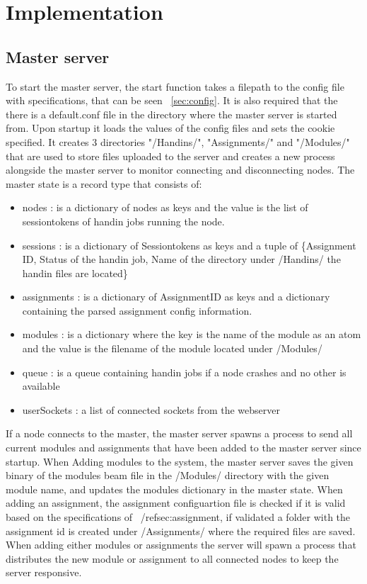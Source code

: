 \section{Implementation}
\subsection{Master server}
To start the master server, the start function takes a filepath to the config file with specifications, that can be seen ~\ref{sec:config}. It is also required that the there is a default.conf file in the directory where the master server is started from. Upon startup it loads the values of the config files and sets the cookie specified. It creates 3 directories "/Handins/", "Assignments/" and "/Modules/" that are used to store files uploaded to the server and creates a new process alongside the master server to monitor connecting and disconnecting nodes. The master state is a record type that consists of:
\begin{itemize}
\item nodes : is a dictionary of nodes as keys and the value is the list of sessiontokens of handin jobs running the node.
\item sessions : is a dictionary of Sessiontokens as keys and a tuple of \{Assignment ID, Status of the handin job, Name of the directory under /Handins/ the handin files are located\}
\item assignments : is a dictionary of AssignmentID as keys and a dictionary containing the parsed assignment config information.
\item modules : is a dictionary where the key is the name of the module as an atom and the value is the filename of the module located under /Modules/
\item queue : is a queue containing handin jobs if a node crashes and no other is available
\item userSockets : a list of connected sockets from the webserver
\end{itemize}

If a node connects to the master, the master server spawns a process to send all current modules and assignments that have been added to the master server since startup. When Adding modules to the system, the master server saves the given binary of the modules beam file in the /Modules/ directory with the given module name, and updates the modules dictionary in the master state. When adding an assignment, the assignment configuartion file is checked if it is valid based on the specifications of ~/ref{sec:assignment}, if validated a folder with the assignment id is created under /Assignments/ where the required files are saved. When adding either modules or assignments the server will spawn a process that distributes the new module or assignment to all connected nodes to keep the server responsive.

